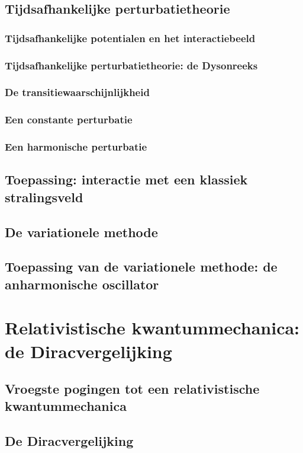 \documentclass[a4paper,twoside]{article}
\theoremstyle{definition}
\theoremstyle{plain}
\begin{document}
\subsection{Tijdsafhankelijke perturbatietheorie}
\subsubsection{Tijdsafhankelijke potentialen en het interactiebeeld}
\subsubsection{Tijdsafhankelijke perturbatietheorie: de Dysonreeks}
\subsubsection{De transitiewaarschijnlijkheid}
\subsubsection{Een constante perturbatie}
\subsubsection{Een harmonische perturbatie}
\subsection{Toepassing: interactie met een klassiek stralingsveld}
\subsection{De variationele methode}
\subsection{Toepassing van de variationele methode: de anharmonische oscillator}

\section{Relativistische kwantummechanica: de Diracvergelijking}
\subsection{Vroegste pogingen tot een relativistische kwantummechanica}
\subsection{De Diracvergelijking}
\end{document}
